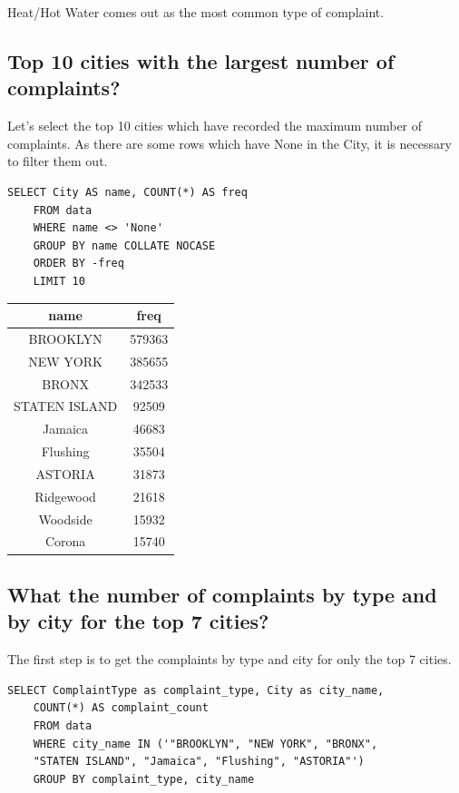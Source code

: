 \documentclass[12pt,a4paper]{article}
\begin{document}
Heat/Hot Water comes out as the most common type of complaint.

\subsection{Top 10 cities with the largest number of complaints?}  \label{top10cities}
Let's select the top 10 cities which have recorded the maximum number of complaints. As there are some rows which have None in the City, it is necessary to filter them out.
\begin{verbatim}
SELECT City AS name, COUNT(*) AS freq
    FROM data
    WHERE name <> 'None'
    GROUP BY name COLLATE NOCASE
    ORDER BY -freq
    LIMIT 10
\end{verbatim}

\begin{center}
 \begin{tabular}{||c c||}
 \hline
 name & freq \\ [0.5ex]
 \hline\hline
BROOKLYN    & 579363 \\
NEW YORK    & 385655 \\
BRONX   & 342533 \\
STATEN ISLAND   & 92509 \\
Jamaica & 46683 \\
Flushing    & 35504 \\
ASTORIA & 31873 \\
Ridgewood   & 21618 \\
Woodside    & 15932 \\
Corona  & 15740 \\ [1ex]
 \hline
\end{tabular}
\end{center}

\subsection{What the number of complaints by type and by city for the top 7 cities?}
The first step is to get the complaints by type and city for only the top 7 cities.
\begin{verbatim}
SELECT ComplaintType as complaint_type, City as city_name,
    COUNT(*) AS complaint_count
    FROM data
    WHERE city_name IN ('"BROOKLYN", "NEW YORK", "BRONX",
    "STATEN ISLAND", "Jamaica", "Flushing", "ASTORIA"')
    GROUP BY complaint_type, city_name
\end{verbatim}
\end{document}
